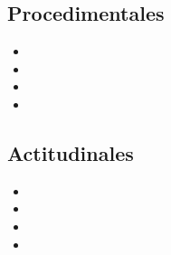 \subsection*{Procedimentales}
\begin{itemize}[labelsep=2pt, itemsep=0.6em]
    \item \lipsum[1][1-3] %
    \item \lipsum[2][1-3] %
    \item \lipsum[3][1-3] %
    \item \lipsum[4][1-3] %
\end{itemize}

\subsection*{Actitudinales}
\begin{itemize}[labelsep=2pt, itemsep=0.6em]
    \item \lipsum[1][1-3] %
    \item \lipsum[2][1-3] %
    \item \lipsum[3][1-3] %
    \item \lipsum[4][1-3] %
\end{itemize}
\pagebreak